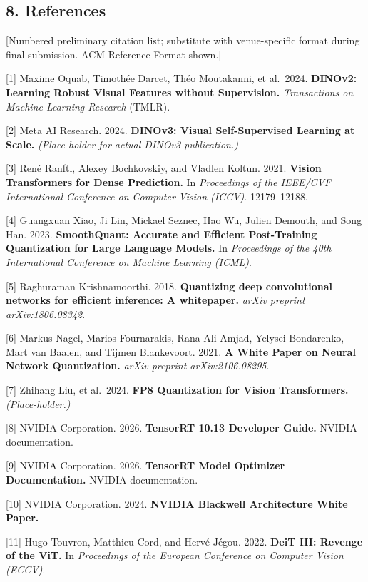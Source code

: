 \documentclass[
]{article}
\begin{document}
\subsection{8. References}\label{references}

{[}Numbered preliminary citation list; substitute with venue-specific
format during final submission. ACM Reference Format shown.{]}

{[}1{]} Maxime Oquab, Timothée Darcet, Théo Moutakanni, et al.~2024.
\textbf{DINOv2: Learning Robust Visual Features without Supervision.}
\emph{Transactions on Machine Learning Research} (TMLR).

{[}2{]} Meta AI Research. 2024. \textbf{DINOv3: Visual Self-Supervised
Learning at Scale.} \emph{(Place-holder for actual DINOv3 publication.)}

{[}3{]} René Ranftl, Alexey Bochkovskiy, and Vladlen Koltun. 2021.
\textbf{Vision Transformers for Dense Prediction.} In \emph{Proceedings
of the IEEE/CVF International Conference on Computer Vision (ICCV)}.
12179--12188.

{[}4{]} Guangxuan Xiao, Ji Lin, Mickael Seznec, Hao Wu, Julien Demouth,
and Song Han. 2023. \textbf{SmoothQuant: Accurate and Efficient
Post-Training Quantization for Large Language Models.} In
\emph{Proceedings of the 40th International Conference on Machine
Learning (ICML)}.

{[}5{]} Raghuraman Krishnamoorthi. 2018. \textbf{Quantizing deep
convolutional networks for efficient inference: A whitepaper.}
\emph{arXiv preprint arXiv:1806.08342}.

{[}6{]} Markus Nagel, Marios Fournarakis, Rana Ali Amjad, Yelysei
Bondarenko, Mart van Baalen, and Tijmen Blankevoort. 2021. \textbf{A
White Paper on Neural Network Quantization.} \emph{arXiv preprint
arXiv:2106.08295}.

{[}7{]} Zhihang Liu, et al.~2024. \textbf{FP8 Quantization for Vision
Transformers.} \emph{(Place-holder.)}

{[}8{]} NVIDIA Corporation. 2026. \textbf{TensorRT 10.13 Developer
Guide.} NVIDIA documentation.

{[}9{]} NVIDIA Corporation. 2026. \textbf{TensorRT Model Optimizer
Documentation.} NVIDIA documentation.

{[}10{]} NVIDIA Corporation. 2024. \textbf{NVIDIA Blackwell Architecture
White Paper.}

{[}11{]} Hugo Touvron, Matthieu Cord, and Hervé Jégou. 2022.
\textbf{DeiT III: Revenge of the ViT.} In \emph{Proceedings of the
European Conference on Computer Vision (ECCV)}.
\end{document}
